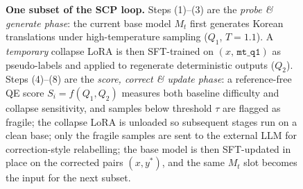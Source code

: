 \begin{figure}[t]
{\begin{tikzpicture}
\end{tikzpicture}%
}
\caption{\textbf{One subset of the SCP loop.}
Steps (1)--(3) are the \emph{probe \& generate phase}: the current base
model $M_t$ first generates Korean translations under high-temperature
sampling ($Q_1$, $T{=}1.1$). A \emph{temporary} collapse LoRA is then
SFT-trained on $(x,\,\texttt{mt\_q1})$ as pseudo-labels and applied to
regenerate deterministic outputs ($Q_2$).
Steps (4)--(8) are the \emph{score, correct \& update phase}: a
reference-free QE score $S_i = f(Q_1, Q_2)$ measures both baseline
difficulty and collapse sensitivity, and samples below threshold $\tau$ are
flagged as fragile; the collapse LoRA is unloaded so subsequent stages run
on a clean base; only the fragile samples are sent to the external LLM for
correction-style relabelling; the base model is then SFT-updated in place
on the corrected pairs $(x, y^{*})$, and the same $M_t$ slot becomes the
input for the next subset.}
\label{fig:scp-loop}
\end{figure}
